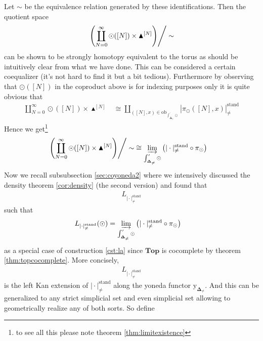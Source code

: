 Let $\sim$ be the equivalence relation generated by these identifications. Then the quotient space
\begin{align*}
  \left.
    \left(
      \coprod_{N=0}^{\infty}
      \odot([N])
      \times
      \blacktriangle^{[N]}
    \right)
  \right\slash
  \sim
\end{align*}
can be shown to be strongly homotopy equivalent to the torus as should be intuitively clear from what we have done. This can be considered a certain coequalizer (it's not hard to find it but a bit tedious). Furthermore by observing that $\odot([N])$ in the coproduct above is for indexing purposes only it is quite obvious that
\begin{align*}
  \coprod_{N=0}^{\infty}
  \odot([N])
  \times
  \blacktriangle^{[N]}
  &\cong
  \coprod_{([N],x) \in \mathrm{ob}_{\int_{\mathbf{\Delta}_{\neq}}^{\prime}\odot}}
  \left\vert
    \pi_{\odot}([N],x)
  \right\vert_{\neq}^{\textrm{stand}}
\end{align*}
Hence we get\footnote{to see all this please note theorem \ref{thm:limitexistence}}
\begin{align*}
  \left.
    \left(
      \coprod_{N=0}^{\infty}
      \odot([N])
      \times
      \blacktriangle^{[N]}
    \right)
  \right\slash
  \sim
  &\cong
  \varinjlim_{\int_{\mathbf{\Delta}_{\neq}}^{\prime}\odot}
  \left(
    \vert
      \cdot
    \vert_{\neq}^{\textrm{stand}}
    \circ
    \pi_{\odot}
  \right)
\end{align*}
Now we recall subsubsection \ref{sec:coyoneda2} where we intensively discussed the density theorem \ref{cor:density} (the second version) and found that
\begin{align*}
  L_{\vert \cdot \vert_{\neq}^{\textrm{stand}}}
\end{align*}
such that
\begin{align*}
  L_{\vert \cdot \vert_{\neq}^{\textrm{stand}}}
  (\odot)
  &=
  \varinjlim_{\int_{\mathbf{\Delta}_{\neq}}^{\prime}\odot}
  \left(
    \vert
      \cdot
    \vert_{\neq}^{\textrm{stand}}
    \circ
    \pi_{\odot}
  \right)
\end{align*}
as a special case of construction \ref{cst:la} since $\mathbf{Top}$ is cocomplete by theorem \ref{thm:topcocomplete}. More concisely,
\begin{align*}
  L_{\vert \cdot \vert_{\neq}^{\textrm{stand}}}
\end{align*}
is the left Kan extension of $\vert \cdot \vert_{\neq}^{\textrm{stand}}$ along the yoneda functor $\mathrm{y}_{\mathbf{\Delta}_{\neq}}$. And this can be generalized to any strict simplicial set and even simplicial set allowing to geometrically realize any of both sorts. So define
